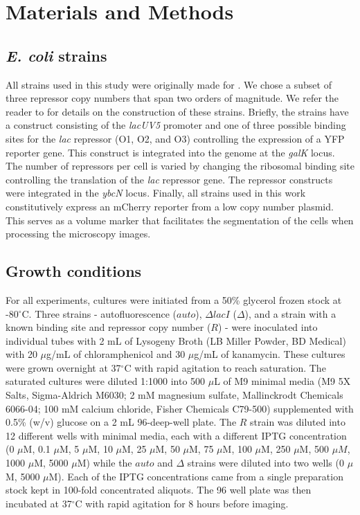\section{Materials and Methods}

\subsection{\textit{E. coli} strains}

All strains used in this study were originally made for \cite{Razo-Mejia2018}.
We chose a subset of three repressor copy numbers that span two orders of
magnitude. We refer the reader to \cite{Razo-Mejia2018} for details on the
construction of these strains. Briefly, the strains have a construct consisting
of the \textit{lacUV5} promoter and one of three possible binding sites for the
\textit{lac} repressor (O1, O2, and O3) controlling the expression of a YFP
reporter gene. This construct is integrated into the genome at the
\textit{galK} locus. The number of repressors per cell is varied by changing
the ribosomal binding site controlling the translation of the \textit{lac}
repressor gene. The repressor constructs were integrated in the \textit{ybcN}
locus. Finally, all strains used in this work constitutively express an mCherry
reporter from a low copy number plasmid. This serves as a volume marker that
facilitates the segmentation of the cells when processing the microscopy
images.

\subsection{Growth conditions}

For all experiments, cultures were initiated from a 50\% glycerol frozen stock
at -80$^\circ$C. Three strains - autofluorescence ($auto$), $\Delta lacI$
($\Delta$), and a strain with a known binding site and repressor copy number
($R$) - were inoculated into individual tubes with 2 mL of Lysogeny Broth (LB
Miller Powder, BD Medical) with 20 $\mu$g/mL of chloramphenicol and 30
$\mu$g/mL of kanamycin. These cultures were grown overnight at 37$^\circ$C with 
rapid agitation to reach saturation. The saturated cultures were diluted 1:1000
into 500 $\mu$L of M9 minimal media (M9 5X Salts, Sigma-Aldrich M6030; 2 mM
magnesium sulfate, Mallinckrodt Chemicals 6066-04; 100 mM calcium chloride,
Fisher Chemicals C79-500) supplemented with 0.5\% (w/v) glucose on a 2 mL
96-deep-well plate. The $R$ strain was diluted into 12 different wells with
minimal media, each with a different IPTG  concentration (0 $\mu$M, 0.1 $\mu$M,
5 $\mu$M, 10 $\mu$M, 25 $\mu$M, 50 $\mu$M, 75 $\mu$M, 100 $\mu$M, 250 $\mu$M,
500 $\mu M$, 1000 $\mu$M, 5000 $\mu$M) while  the $auto$ and $\Delta$ strains
were diluted into two wells (0 $\mu$M, 5000 $\mu$M). Each of the IPTG
concentrations came from a single preparation stock kept in 100-fold
concentrated aliquots. The 96 well plate was then incubated at 37$^\circ$C with
rapid agitation for 8 hours before imaging.

